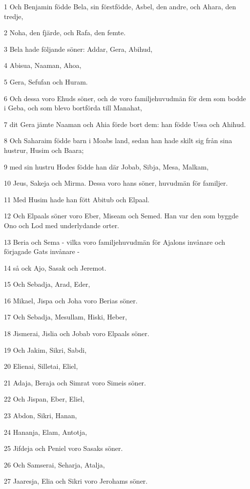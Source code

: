 \par 1 Och Benjamin födde Bela, sin förstfödde, Asbel, den andre, och Ahara, den tredje,
\par 2 Noha, den fjärde, och Rafa, den femte.
\par 3 Bela hade följande söner: Addar, Gera, Abihud,
\par 4 Abisua, Naaman, Ahoa,
\par 5 Gera, Sefufan och Huram.
\par 6 Och dessa voro Ehuds söner, och de voro familjehuvudmän för dem som bodde i Geba, och som blevo bortförda till Manahat,
\par 7 dit Gera jämte Naaman och Ahia förde bort dem: han födde Ussa och Ahihud.
\par 8 Och Saharaim födde barn i Moabs land, sedan han hade skilt sig från sina hustrur, Husim och Baara;
\par 9 med sin hustru Hodes födde han där Jobab, Sibja, Mesa, Malkam,
\par 10 Jeus, Sakeja och Mirma. Dessa voro hans söner, huvudmän för familjer.
\par 11 Med Husim hade han fött Abitub och Elpaal.
\par 12 Och Elpaals söner voro Eber, Miseam och Semed. Han var den som byggde Ono och Lod med underlydande orter.
\par 13 Beria och Sema - vilka voro familjehuvudmän för Ajalons invånare och förjagade Gats invånare -
\par 14 så ock Ajo, Sasak och Jeremot.
\par 15 Och Sebadja, Arad, Eder,
\par 16 Mikael, Jispa och Joha voro Berias söner.
\par 17 Och Sebadja, Mesullam, Hiski, Heber,
\par 18 Jismerai, Jislia och Jobab voro Elpaals söner.
\par 19 Och Jakim, Sikri, Sabdi,
\par 20 Elienai, Silletai, Eliel,
\par 21 Adaja, Beraja och Simrat voro Simeis söner.
\par 22 Och Jispan, Eber, Eliel,
\par 23 Abdon, Sikri, Hanan,
\par 24 Hananja, Elam, Antotja,
\par 25 Jifdeja och Peniel voro Sasaks söner.
\par 26 Och Samserai, Seharja, Atalja,
\par 27 Jaaresja, Elia och Sikri voro Jerohams söner.

